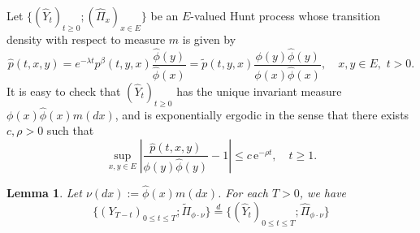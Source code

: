 \documentclass[12pt,a4paper]{amsart}
\theoremstyle{plain}
\newtheorem{lem}[thm]{Lemma}
\theoremstyle{definition}
\numberwithin{equation}{section}
\begin{document}
	Let $\{(\hat{Y}_t)_{t\geq 0}; (\hat{\Pi}_x)_{x\in E}\}$ be an $E$-valued Hunt process whose transition density with respect to measure $m$ is given by
\[
    \hat{p}(t,x,y)
    =e^{-\lambda t}p^\beta(t,y,x)\frac{{\hat\phi}(y)}{{\hat\phi}(x)}
    =\tilde p(t,y,x)\frac{\phi(y){\hat\phi}(y)}{\phi(x){\hat\phi}(x)},
    \quad x,y \in E,\,\, t> 0.
\]
	It is easy to check that $(\widehat Y_t)_{t\geq 0}$ has the unique invariant measure $\phi(x)\hat\phi(x)m(dx)$, and is exponentially ergodic in the sense that there exists $c, \rho > 0$ such that
\begin{equation}\label{IU'}
	\sup_{x,y\in E}\left|\frac{\hat{p}(t, x,y)}{\phi(y) \hat\phi(y)}- 1\right|\le c\,\mbox{e}^{-\rho t}, \quad t\geq 1.
\end{equation}
\begin{lem}
\label{lem:reverse of the spine}
	Let $\nu(dx):=\hat\phi(x)m(dx)$.
	For each $T > 0$, we have
\[
	\{(Y_{T-t})_{0\leq t\leq T}; \widetilde \Pi_{\phi \cdot \nu}\}
	\overset{d}{=} \{(\widehat Y_{t})_{0\leq t\leq T}; \widehat \Pi_{\phi \cdot \nu}\}
\]
\end{lem}
\end{document}
